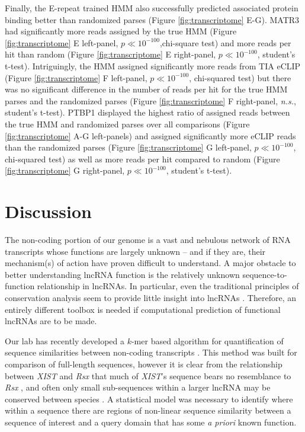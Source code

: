 Finally, the E-repeat trained HMM also successfully predicted associated protein binding better than randomized parses (Figure \ref{fig:transcriptome} E-G). MATR3 had significantly more reads assigned by the true HMM (Figure \ref{fig:transcriptome} E left-panel, $p\ll 10^{-100}$,chi-square test) and more reads per hit than random (Figure \ref{fig:transcriptome} E right-panel, $p\ll 10^{-100}$, student's t-test). Intriguingly, the HMM assigned significantly more reads from TIA eCLIP (Figure \ref{fig:transcriptome} F left-panel, $p\ll 10^{-100}$, chi-squared test) but there was no significant difference in the number of reads per hit for the true HMM parses and the randomized parses (Figure \ref{fig:transcriptome} F right-panel, \emph{n.s.}, student's t-test). PTBP1 displayed the highest ratio of assigned reads between the true HMM and randomized parses over all comparisons (Figure \ref{fig:transcriptome} A-G left-panels) and assigned significantly more eCLIP reads than the randomized parses (Figure \ref{fig:transcriptome} G left-panel, $p\ll10^{-100}$, chi-squared test) as well as more reads per hit compared to random (Figure \ref{fig:transcriptome} G right-panel, $p\ll10^{-100}$, student's t-test). 



\section{Discussion}
The non-coding portion of our genome is a vast and nebulous network of RNA transcripts whose functions are largely unknown -- and if they are, their mechanism(s) of action have proven difficult to understand. A major obstacle to better understanding lncRNA function is the relatively unknown sequence-to-function relationship in lncRNAs. In particular, even the traditional principles of conservation analysis seem to provide little insight into lncRNAs \cite{Johnsson2014EvolutionaryFunction,Pang2006RapidFunction,Nesterova2001CharacterizationSequence}. Therefore, an entirely different toolbox is needed if computational prediction of functional lncRNAs are to be made.

Our lab has recently developed a $k$-mer based algorithm for quantification of sequence similarities between non-coding transcripts \cite{Kirk2018FunctionalContent}. This method was built for comparison of full-length sequences, however it is clear from the relationship between \emph{XIST} and \emph{Rsx} that much of \emph{XIST}'s sequence bears no resemblance to \emph{Rsx} \cite{Sprague2019NonlinearDomains}, and often only small sub-sequences within a larger lncRNA may be conserved between species \cite{Pang2006RapidFunction,Nesterova2001CharacterizationSequence}. A statistical model was necessary to identify where within a sequence there are regions of non-linear sequence similarity between a sequence of interest and a query domain that has some \emph{a priori} known function.

